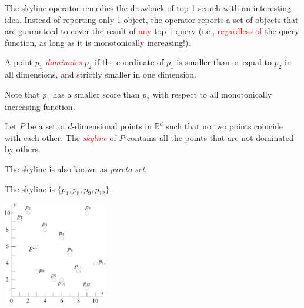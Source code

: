 \documentclass{beamer}
\newcommand{\red}[1]{\textcolor{red}{#1}}
\def\real{\mathbb{R}}
\begin{document}
    \begin{frame}
    \begin{small}
        The skyline operator remedies the drawback of top-1 search with an interesting idea. Instead of reporting only 1 object, the operator reports a set of objects that are guaranteed to cover the result of \red{any} top-1 query (i.e., \red{regardless of} the query function, as long as it is monotonically increasing!).
    \end{small}
    \end{frame}
    \begin{frame}
    \begin{small}
        \begin{definition}[Dominance]
            A point $p_1$ \red{\em dominates} $p_2$ if the coordinate of $p_1$ is smaller than or equal to $p_2$ in all dimensions, and strictly smaller in one dimension.
        \end{definition}

        Note that $p_1$ has a smaller score than $p_2$ with respect to all monotonically increasing function.

        \begin{definition}[Skyline]
            Let $P$ be a set of $d$-dimensional points in $\real^d$ such that no two points coincide with each other. The \red{\em skyline} of $P$ contains all the points that are not dominated by others.
        \end{definition}

        The skyline is also known as {\em pareto set}.
    \end{small}
    \end{frame}
    \begin{frame}
    \begin{small}
        The skyline is $\{p_1, p_8, p_9, p_{12}\}$.
        \begin{center}
            \includegraphics[height=45mm]{./artwork/data.pdf}
        \end{center}
    \end{small}
    \end{frame}
\end{document}
